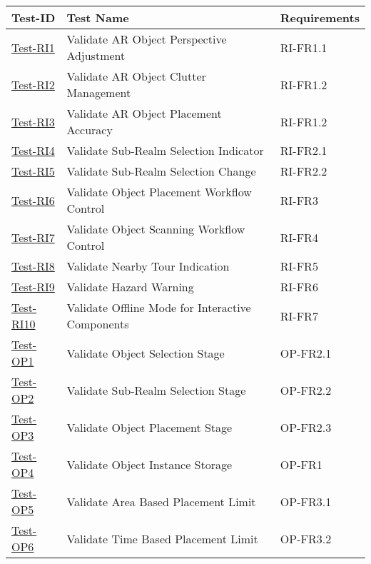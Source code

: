 \documentclass[12pt, titlepage]{article}
\begin{document}
\begin{enumerate}
\begin{table}[h!]
    \centering
    \begin{tabular}{|l|l|l|}
        \hline
        \textbf{Test-ID} & \textbf{Test Name} &\textbf{Requirements} \\
        \hline
        \hyperref[itm:Test-RI1]{Test-RI1} & Validate AR Object Perspective Adjustment & RI-FR1.1 \\
        \hline
        \hyperref[itm:Test-RI2]{Test-RI2} & Validate AR Object Clutter Management & RI-FR1.2 \\
        \hline
        \hyperref[itm:Test-RI3]{Test-RI3} & Validate AR Object Placement Accuracy & RI-FR1.2 \\
        \hline
        \hyperref[itm:Test-RI4]{Test-RI4} & Validate Sub-Realm Selection Indicator & RI-FR2.1 \\
        \hline
        \hyperref[itm:Test-RI5]{Test-RI5} & Validate Sub-Realm Selection Change & RI-FR2.2 \\
        \hline
        \hyperref[itm:Test-RI6]{Test-RI6} & Validate Object Placement Workflow Control & RI-FR3 \\
        \hline
        \hyperref[itm:Test-RI7]{Test-RI7} & Validate Object Scanning Workflow Control & RI-FR4 \\
        \hline
        \hyperref[itm:Test-RI8]{Test-RI8} & Validate Nearby Tour Indication & RI-FR5 \\
        \hline
        \hyperref[itm:Test-RI9]{Test-RI9} & Validate Hazard Warning & RI-FR6 \\
        \hline
        \hyperref[itm:Test-RI10]{Test-RI10} & Validate Offline Mode for Interactive Components & RI-FR7 \\
        \hline
        \hyperref[itm:Test-OP1]{Test-OP1} & Validate Object Selection Stage & OP-FR2.1 \\
        \hline
        \hyperref[itm:Test-OP2]{Test-OP2} & Validate Sub-Realm Selection Stage & OP-FR2.2 \\
        \hline
        \hyperref[itm:Test-OP3]{Test-OP3} & Validate Object Placement Stage & OP-FR2.3 \\
        \hline
        \hyperref[itm:Test-OP4]{Test-OP4} & Validate Object Instance Storage & OP-FR1 \\
        \hline
        \hyperref[itm:Test-OP5]{Test-OP5} & Validate Area Based Placement Limit & OP-FR3.1 \\
        \hline
        \hyperref[itm:Test-OP6]{Test-OP6} & Validate Time Based Placement Limit & OP-FR3.2 \\

\end{tabular}
\end{table}
\end{enumerate}
\end{document}
